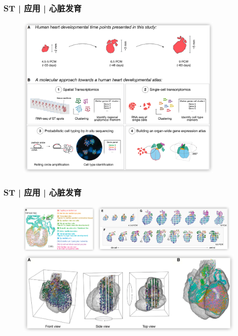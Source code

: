 \documentclass[11pt]{ctexbeamer}
\begin{document}
\begin{frame}
	\frametitle{ST | 应用 | 心脏发育}
			\begin{figure}
		\includegraphics[width=0.9\textwidth]{ST_heart_07.png}
	\end{figure}
\end{frame}

\begin{frame}
	\frametitle{ST | 应用 | 心脏发育}
	\begin{figure}
		\includegraphics[width=0.34\textwidth]{ST_heart_05.png}
	    \includegraphics[width=0.63\textwidth]{ST_heart_06.png}\\
	    \includegraphics[width=\textwidth]{ST_heart_04.png}
	\end{figure}
\end{frame}
\end{document}
